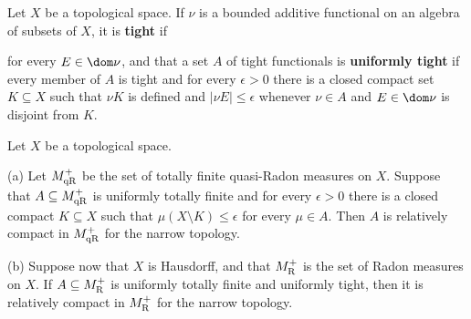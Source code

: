 Let $X$ be a topological space.   If $\nu$ is a bounded additive functional
on an algebra of subsets of $X$, it is {\bf tight} if


\noindent for every $E\in\dom\nu$, and that a set $A$ of tight functionals
is {\bf uniformly tight} if every member of $A$ is tight
and for every $\epsilon>0$ there is a
closed compact set $K\subseteq X$ such that $\nu K$ is defined and
$|\nu E|\le\epsilon$ whenever $\nu\in A$ and $E\in\dom\nu$ is disjoint from
$K$.

 Let $X$ be a topological space.

(a) Let $M^+_{\text{qR}}$ be the
set of totally finite quasi-Radon measures on $X$.   Suppose that
$A\subseteq M^+_{\text{qR}}$ is uniformly totally finite and for every
$\epsilon>0$ there is a
closed compact $K\subseteq X$ such that $\mu(X\setminus K)\le\epsilon$ for
every $\mu\in A$.   Then $A$ is relatively compact in $M^+_{\text{qR}}$ for the narrow
topology.

(b) Suppose now that $X$ is Hausdorff, and that $M^+_{\text{R}}$ is the set of Radon
measures on $X$.   If $A\subseteq M^+_{\text{R}}$ is uniformly totally finite and
uniformly tight, then
it is relatively compact in $M^+_{\text{R}}$ for the narrow topology.


